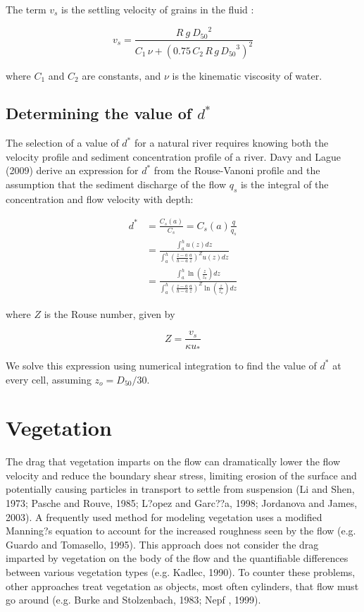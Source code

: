 \documentclass[11pt]{article}
\begin{document}
The term $v_s$ is the settling velocity of grains in the fluid \citep{ferguson2004simple}:

\begin{equation}
v_s = \frac{R \: g \: {D_{50}}^2}{C_1 \, \nu + (0.75 \, C_2 \, R \, g \, {D_{50}}^3)^2}
\end{equation}

\noindent where $C_1$ and $C_2$ are constants, and $\nu$ is the kinematic viscosity of water. 

\subsection{Determining the value of $d^*$}
The selection of a value of $d^*$ for a natural river requires knowing both the velocity profile and sediment concentration profile of a river. Davy and Lague (2009) derive an expression for $d^*$ from the Rouse-Vanoni profile and the assumption that the sediment discharge of the flow $q_s$ is the integral of the concentration and flow velocity with depth:

\begin{equation}
\begin{split}
d^* & = \frac{C_s(a)}{C_s} = C_s(a) \frac{q}{q_s} \\
& = \frac{\int_{a}^{h} u(z) dz}{\int_{a}^{h} (\frac{z-a}{h-a}\frac{a}{z})^Z u(z) dz} \\
& = \frac{\int_{a}^{h} \ln{(\frac{z}{z_o})} dz}{\int_{a}^{h} (\frac{z-a}{h-a}\frac{a}{z})^Z \ln{(\frac{z}{z_o})} dz}
\end{split}
\end{equation} 

\noindent where $Z$ is the Rouse number, given by

\begin{equation}
Z = \frac{v_s}{\kappa u_*}
\end{equation}

We solve this expression using numerical integration to find the value of $d^*$ at every cell, assuming $z_o = D_{50}/30$.

\section{Vegetation}

The drag that vegetation imparts on the flow can dramatically lower the flow velocity and reduce the boundary shear stress, limiting erosion of the surface and potentially causing particles in transport to settle from suspension (Li and Shen, 1973; Pasche and Rouve, 1985; L?opez and Garc??a, 1998; Jordanova and James, 2003). A frequently used method for modeling vegetation uses a modified Manning?s equation to account for the increased roughness seen by the flow (e.g. Guardo and Tomasello, 1995). This approach does not consider the drag imparted by vegetation on the body of the flow and the quantifiable differences between various vegetation types (e.g. Kadlec, 1990). To counter these problems, other approaches treat vegetation as objects, most often cylinders, that flow must go around (e.g. Burke and Stolzenbach, 1983; Nepf , 1999).
\end{document}
